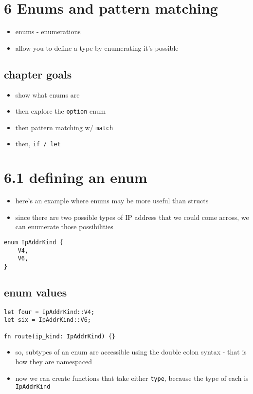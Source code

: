 \documentclass[11pt]{article}
\author{Jack M}
\date{\today}
\title{}
\begin{document}
\tableofcontents

\section{6 Enums and pattern matching}
\label{sec:org5d5bd09}
\begin{itemize}
\item enums - enumerations
\item allow you to define a type by enumerating it's possible
\end{itemize}

\subsection{chapter goals}
\label{sec:orge864273}
\begin{itemize}
\item show what enums are
\item then explore the \texttt{option} enum
\item then pattern matching w/ \texttt{match}
\item then, \texttt{if / let}
\end{itemize}

\section{6.1 defining an enum}
\label{sec:org90e6ea5}
\begin{itemize}
\item here's an example where enums may be more useful than structs
\item since there are two possible types of IP address that we could come across, we can enumerate those possibilities
\end{itemize}
\begin{verbatim}
enum IpAddrKind {
    V4,
    V6,
}
\end{verbatim}


\subsection{enum values}
\label{sec:orge9778e1}
\begin{verbatim}
let four = IpAddrKind::V4;
let six = IpAddrKind::V6;

fn route(ip_kind: IpAddrKind) {}
\end{verbatim}
\begin{itemize}
\item so, subtypes of an enum are accessible using the double colon syntax - that is how they are namespaced
\item now we can create functions that take either \texttt{type}, because the type of each is \texttt{IpAddrKind}
\end{itemize}
\end{document}
